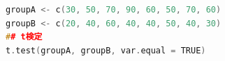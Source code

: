 \begin{lstlisting}[language=c++,label={code:19_03},caption={帰無仮説検定のコード}]
groupA <- c(30, 50, 70, 90, 60, 50, 70, 60)
groupB <- c(20, 40, 60, 40, 40, 50, 40, 30)
## t検定
t.test(groupA, groupB, var.equal = TRUE)
\end{lstlisting}
